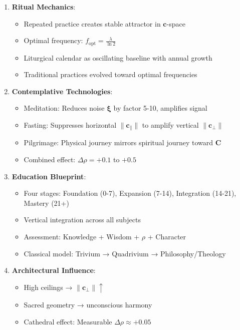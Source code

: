 \documentclass[11pt,a4paper]{article}
\theoremstyle{definition}
\theoremstyle{remark}
\newcommand{\cc}{\mathbf{c}}
\begin{document}
\begin{enumerate}
\begin{protocol}
\begin{mdframed}[backgroundcolor=green!10,linewidth=2pt,linecolor=green!70!black]
\begin{enumerate}[nosep]
    \item \textbf{Ritual Mechanics}:
        \begin{itemize}[nosep]
            \item Repeated practice creates stable attractor in \(\cc\)-space
            \item Optimal frequency: \(f_{\text{opt}} = \frac{\lambda}{\ln 2}\)
            \item Liturgical calendar as oscillating baseline with annual growth
            \item Traditional practices evolved toward optimal frequencies
        \end{itemize}
    
    \item \textbf{Contemplative Technologies}:
        \begin{itemize}[nosep]
            \item Meditation: Reduces noise \(\boldsymbol{\xi}\) by factor 5-10, amplifies signal
            \item Fasting: Suppresses horizontal \(\|\cc_\parallel\|\) to amplify vertical \(\|\cc_\perp\|\)
            \item Pilgrimage: Physical journey mirrors spiritual journey toward \(\mathbf{C}\)
            \item Combined effect: \(\Delta\rho = +0.1\) to \(+0.5\)
        \end{itemize}
    
    \item \textbf{Education Blueprint}:
        \begin{itemize}[nosep]
            \item Four stages: Foundation (0-7), Expansion (7-14), Integration (14-21), Mastery (21+)
            \item Vertical integration across all subjects
            \item Assessment: Knowledge + Wisdom + \(\rho\) + Character
            \item Classical model: Trivium → Quadrivium → Philosophy/Theology
        \end{itemize}
    
    \item \textbf{Architectural Influence}:
        \begin{itemize}[nosep]
            \item High ceilings → \(\|\cc_\perp\| \uparrow\)
            \item Sacred geometry → unconscious harmony
            \item Cathedral effect: Measurable \(\Delta\rho \approx +0.05\)
        \end{itemize}
\end{enumerate}


\end{mdframed}
\end{protocol}
\end{enumerate}
\end{document}
